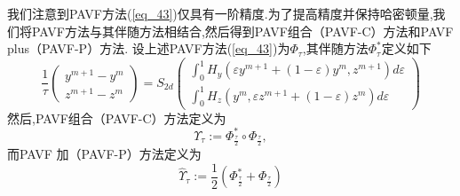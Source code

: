 我们注意到PAVF方法(\ref{eq_43})仅具有一阶精度\cite{caiPartitionedAveragedVector2018}.为了提高精度并保持哈密顿量,我们将PAVF方法与其伴随方法相结合,然后得到PAVF组合（PAVF-C）方法和PAVF plus（PAVF-P）方法.
设上述PAVF方法(\ref{eq_43})为$\Phi_{\tau}$,其伴随方法$\Phi_{\tau}^{*}$定义如下
\begin{equation}
\frac{1}{\tau}\left(\begin{array}{c}
y^{m+1}-y^{m} \\
z^{m+1}-z^{m}
\end{array}\right)=S_{2 d}\left(\begin{array}{c}
\int_{0}^{1} H_{y}\left(\varepsilon y^{m+1}+(1-\varepsilon) y^{m}, z^{m+1}\right) d \varepsilon \\
\int_{0}^{1} H_{z}\left(y^{m}, \varepsilon z^{m+1}+(1-\varepsilon) z^{m}\right) d \varepsilon
\end{array}\right)
\label{eq_44}\end{equation}
然后,PAVF组合（PAVF-C）方法定义为
\begin{equation}
\Upsilon_{\tau}:=\Phi_{\frac{\tau}{2}}^{*} \circ \Phi_{\frac{\tau}{2}},
\label{eq_45}\end{equation}
而PAVF 加（PAVF-P）方法定义为
\begin{equation}
\hat{\Upsilon}_{\tau}:=\frac{1}{2}\left(\Phi_{\frac{\tau}{2}}^{*}+\Phi_{\frac{\tau}{2}}\right)
\label{eq_46}\end{equation}




